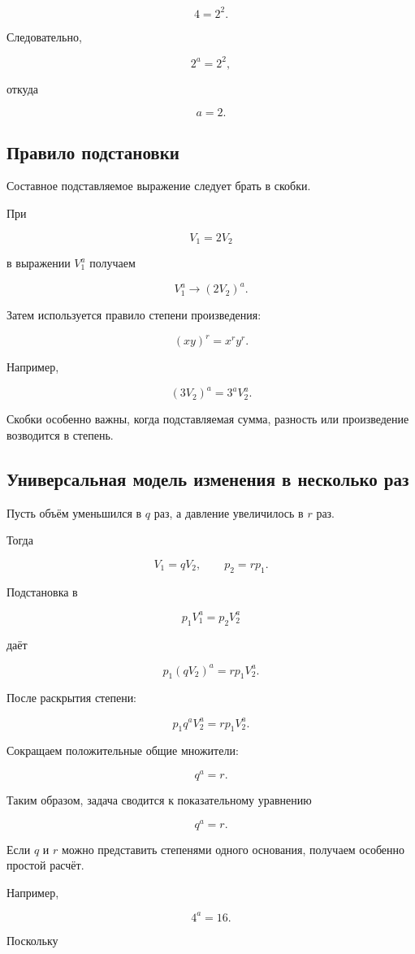 \documentclass[a4paper,12pt]{article}
\newcommand{\subsect}[1]{%
  \subsection*{\color{accent}#1}%
}
\begin{document}
\[
4=2^2.
\]

Следовательно,

\[
2^a=2^2,
\]

откуда

\[
\boxed{a=2}.
\]


\subsect{Правило подстановки}

Составное подставляемое выражение следует брать в скобки.

При

\[
V_1=2V_2
\]

в выражении $V_1^a$ получаем

\[
V_1^a
\longrightarrow
(2V_2)^a.
\]

Затем используется правило степени произведения:

\[
(xy)^r=x^ry^r.
\]

Например,

\[
(3V_2)^a
=
3^aV_2^a.
\]

Скобки особенно важны, когда подставляемая сумма,
разность или произведение возводится в степень.


\subsect{Универсальная модель изменения в несколько раз}

Пусть объём уменьшился в $q$ раз,
а давление увеличилось в $r$ раз.

Тогда

\[
V_1=qV_2,
\qquad
p_2=rp_1.
\]

Подстановка в

\[
p_1V_1^a=p_2V_2^a
\]

даёт

\[
p_1(qV_2)^a
=
rp_1V_2^a.
\]

После раскрытия степени:

\[
p_1q^aV_2^a
=
rp_1V_2^a.
\]

Сокращаем положительные общие множители:

\[
q^a=r.
\]

Таким образом, задача сводится к показательному уравнению

\[
\boxed{q^a=r}.
\]

Если $q$ и $r$ можно представить степенями одного основания,
получаем особенно простой расчёт.

Например,

\[
4^a=16.
\]

Поскольку
\end{document}
